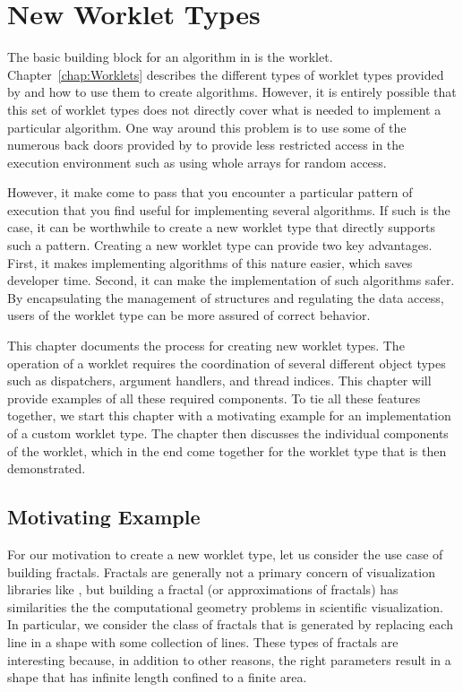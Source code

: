 
\chapter{New Worklet Types}
\label{chap:NewWorkletTypes}


The basic building block for an algorithm in \VTKm is the worklet.
Chapter~\ref{chap:Worklets} describes the different types of worklet types provided by \VTKm and how to use them to create algorithms.
However, it is entirely possible that this set of worklet types does not directly cover what is needed to implement a particular algorithm.
One way around this problem is to use some of the numerous back doors provided by \VTKm to provide less restricted access in the execution environment such as using whole arrays for random access.

However, it make come to pass that you encounter a particular pattern of execution that you find useful for implementing several algorithms.
If such is the case, it can be worthwhile to create a new worklet type that directly supports such a pattern.
Creating a new worklet type can provide two key advantages.
First, it makes implementing algorithms of this nature easier, which saves developer time.
Second, it can make the implementation of such algorithms safer.
By encapsulating the management of structures and regulating the data access, users of the worklet type can be more assured of correct behavior.

This chapter documents the process for creating new worklet types.
The operation of a worklet requires the coordination of several different object types such as dispatchers, argument handlers, and thread indices.
This chapter will provide examples of all these required components.
To tie all these features together, we start this chapter with a motivating example for an implementation of a custom worklet type.
The chapter then discusses the individual components of the worklet, which in the end come together for the worklet type that is then demonstrated.

\section{Motivating Example}
\label{sec:NewWorkletTypes:MotivatingExample}

For our motivation to create a new worklet type, let us consider the use case of building fractals.
Fractals are generally not a primary concern of visualization libraries like \VTKm, but building a fractal (or approximations of fractals) has similarities the the computational geometry problems in scientific visualization.
In particular, we consider the class of fractals that is generated by replacing each line in a shape with some collection of lines.
These types of fractals are interesting because, in addition to other reasons, the right parameters result in a shape that has infinite length confined to a finite area.

